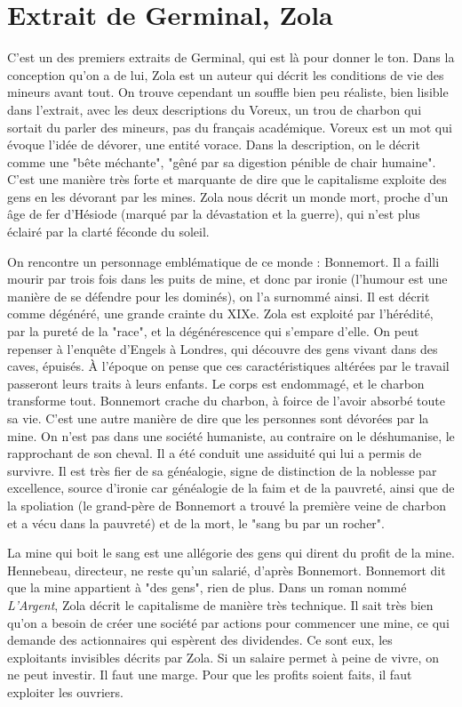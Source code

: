 \documentclass[a4paper,12pt]{book}
\begin{document}
\section{Extrait de Germinal, Zola}
C'est un des premiers extraits de Germinal, qui est là pour donner le ton. Dans la conception qu'on a de lui, Zola est un auteur qui décrit les conditions de vie des mineurs avant tout. On trouve cependant un souffle bien peu réaliste, bien lisible dans l'extrait, avec les deux descriptions du Voreux, un trou de charbon qui sortait du parler des mineurs, pas du français académique. Voreux est un mot qui évoque l'idée de dévorer, une entité vorace. Dans la description, on le décrit comme une "bête méchante", "gêné par sa digestion pénible de chair humaine". C'est une manière très forte et marquante de dire que le capitalisme exploite des gens en les dévorant par les mines. Zola nous décrit un monde mort, proche d'un âge de fer d'Hésiode (marqué par la dévastation et la guerre), qui n'est plus éclairé par la clarté féconde du soleil.
\par On rencontre un personnage emblématique de ce monde : Bonnemort. Il a failli mourir par trois fois dans les puits de mine, et donc par ironie (l'humour est une manière de se défendre pour les dominés), on l'a surnommé ainsi. Il est décrit comme dégénéré, une grande crainte du XIXe. Zola est exploité par l'hérédité, par la pureté de la "race", et la dégénérescence qui s'empare d'elle. On peut repenser à l'enquête d'Engels à Londres, qui découvre des gens vivant dans des caves, épuisés. À l'époque on pense que ces caractéristiques altérées par le travail passeront leurs traits à leurs enfants. Le corps est endommagé, et le charbon transforme tout. Bonnemort crache du charbon, à foirce de l'avoir absorbé toute sa vie. C'est une autre manière de dire que les personnes sont dévorées par la mine. On n'est pas dans une société humaniste, au contraire on le déshumanise, le rapprochant de son cheval. Il a été conduit une assiduité qui lui a permis de survivre. Il est très fier de sa généalogie, signe de distinction de la noblesse par excellence, source d'ironie car généalogie de la faim et de la pauvreté, ainsi que de la spoliation (le grand-père de Bonnemort a trouvé la première veine de charbon et a vécu dans la pauvreté) et de la mort, le "sang bu par un rocher".
\par La mine qui boit le sang est une allégorie des gens qui dirent du profit de la mine. Hennebeau, directeur, ne reste qu'un salarié, d'après Bonnemort. Bonnemort dit que la mine appartient à "des gens", rien de plus. Dans un roman nommé \textit{L'Argent}, Zola décrit le capitalisme de manière très technique. Il sait très bien qu'on a besoin de créer une société par actions pour commencer une mine, ce qui demande des actionnaires qui espèrent des dividendes. Ce sont eux, les exploitants invisibles décrits par Zola. Si un salaire permet à peine de vivre, on ne peut investir. Il faut une marge. Pour que les profits soient faits, il faut exploiter les ouvriers.
\end{document}
